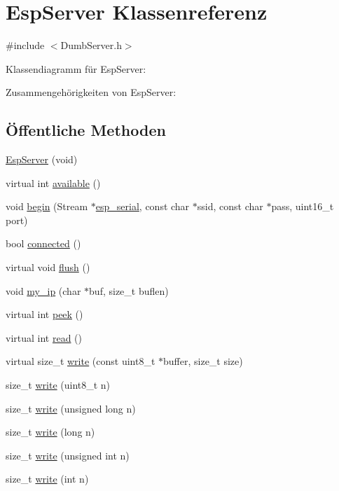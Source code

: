 \hypertarget{classEspServer}{}\section{Esp\+Server Klassenreferenz}
\label{classEspServer}


{\ttfamily \#include $<$Dumb\+Server.\+h$>$}



Klassendiagramm für Esp\+Server\+:


Zusammengehörigkeiten von Esp\+Server\+:
\subsection*{Öffentliche Methoden}
\begin{DoxyCompactItemize}
\item 
\hyperlink{classEspServer_aa852bdd3db81410e2b71cafa8adb5c79}{Esp\+Server} (void)
\item 
virtual int \hyperlink{classEspServer_a4549a76725f2e4c013e4d57018366109}{available} ()
\item 
void \hyperlink{classEspServer_a1d8682ca0934af03639311e23a71283f}{begin} (Stream $\ast$\hyperlink{Arduino__kommentiert_8ino_af690b3a6882292855c4091ede8039998}{esp\+\_\+serial}, const char $\ast$ssid, const char $\ast$pass, uint16\+\_\+t port)
\item 
bool \hyperlink{classEspServer_a59fc494d53391b27e2fd75cb750690d9}{connected} ()
\item 
virtual void \hyperlink{classEspServer_adac116554b543b7c4228c018a85882f5}{flush} ()
\item 
void \hyperlink{classEspServer_a01953c4cc039c37f94dc3e1057126abb}{my\+\_\+ip} (char $\ast$buf, size\+\_\+t buflen)
\item 
virtual int \hyperlink{classEspServer_a9040fa1d479d71edf3a826f4691c35c4}{peek} ()
\item 
virtual int \hyperlink{classEspServer_aaab5dab5b969a87f538242e524431637}{read} ()
\item 
virtual size\+\_\+t \hyperlink{classEspServer_a7c66fc8d559f4956d4ccea196299bca7}{write} (const uint8\+\_\+t $\ast$buffer, size\+\_\+t size)
\item 
size\+\_\+t \hyperlink{classEspServer_af32c245c813bbadb566538bba418b0fe}{write} (uint8\+\_\+t n)
\item 
size\+\_\+t \hyperlink{classEspServer_a0ba52a995edf9b6c2cdf3d396be84ff1}{write} (unsigned long n)
\item 
size\+\_\+t \hyperlink{classEspServer_a3cfec102ee6f58a2f7e617999ce9f5bb}{write} (long n)
\item 
size\+\_\+t \hyperlink{classEspServer_a2d9bc6ac05e45a7023be3cd1ca224407}{write} (unsigned int n)
\item 
size\+\_\+t \hyperlink{classEspServer_a22e7ab55e0aa268cff5b48e763429ec3}{write} (int n)
\end{DoxyCompactItemize}
